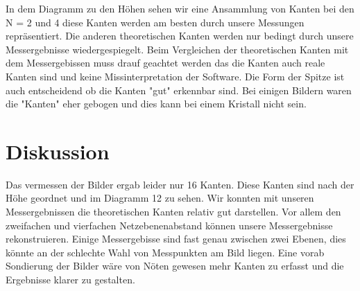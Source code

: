 \documentclass[10pt,a4paper]{article}
\begin{document}
In dem Diagramm zu den Höhen sehen wir eine Ansammlung von Kanten bei den N = 2 und 4 diese Kanten werden am besten durch unsere Messungen repräsentiert. Die anderen theoretischen Kanten werden nur bedingt durch unsere Messergebnisse wiedergespiegelt.
Beim Vergleichen der theoretischen Kanten mit dem Messergebissen muss drauf geachtet werden das die Kanten auch reale Kanten sind und keine Missinterpretation der Software. Die Form der Spitze ist auch entscheidend ob die Kanten "gut" erkennbar sind. Bei einigen Bildern waren die "Kanten" eher gebogen und dies kann bei einem Kristall nicht sein.

\section{Diskussion}

Das vermessen der Bilder ergab leider nur 16 Kanten. Diese Kanten sind nach der Höhe geordnet und im Diagramm 12 zu sehen. Wir konnten mit unseren Messergebnissen die theoretischen Kanten relativ gut darstellen. Vor allem den zweifachen und vierfachen Netzebenenabstand können unsere Messergebnisse rekonstruieren. Einige Messergebisse sind fast genau zwischen zwei Ebenen, dies könnte an der schlechte Wahl von Messpunkten am Bild liegen. Eine vorab Sondierung der Bilder wäre von Nöten gewesen mehr Kanten zu erfasst und die Ergebnisse klarer zu gestalten.
\end{document}
